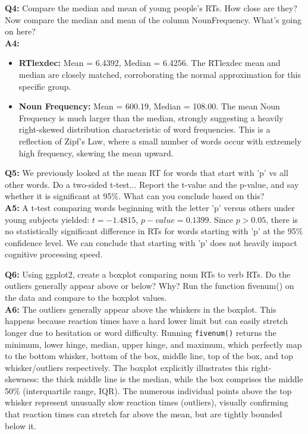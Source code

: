 \documentclass{article}
\begin{document}
\vspace{0.5cm}
\noindent\textbf{Q4:} Compare the median and mean of young people's RTs. How close are they?  Now compare the median and mean of the column NounFrequency. What's going on here? \\
\textbf{A4:} 
\begin{itemize}
    \item \textbf{RTlexdec:} Mean = 6.4392, Median = 6.4256. The RTlexdec mean and median are closely matched, corroborating the normal approximation for this specific group.
    \item \textbf{Noun Frequency:} Mean = 600.19, Median = 108.00. The mean Noun Frequency is much larger than the median, strongly suggesting a heavily right-skewed distribution characteristic of word frequencies. This is a reflection of Zipf's Law, where a small number of words occur with extremely high frequency, skewing the mean upward.
\end{itemize}

\vspace{0.5cm}
\noindent\textbf{Q5:} We previously looked at the mean RT for words that start with 'p' vs all other words. Do a two-sided t-test... Report the t-value and the p-value, and say whether it is significant at 95\%. What can you conclude based on this? \\
\textbf{A5:} A t-test comparing words beginning with the letter 'p' versus others under young subjects yielded: $t = -1.4815$, $p-value = 0.1399$. Since $p > 0.05$, there is no statistically significant difference in RTs for words starting with 'p' at the 95\% confidence level. We can conclude that starting with 'p' does not heavily impact cognitive processing speed.

\vspace{0.5cm}
\noindent\textbf{Q6:} Using ggplot2, create a boxplot comparing noun RTs to verb RTs. Do the outliers generally appear above or below?  Why? Run the function fivenum() on the data and compare to the boxplot values.\\
\textbf{A6:} The outliers generally appear above the whiskers in the boxplot. This happens because reaction times have a hard lower limit but can easily stretch longer due to hesitation or word difficulty. Running \texttt{fivenum()} returns the minimum, lower hinge, median, upper hinge, and maximum, which perfectly map to the bottom whisker, bottom of the box, middle line, top of the box, and top whisker/outliers respectively. The boxplot explicitly illustrates this right-skewness: the thick middle line is the median, while the box comprises the middle 50\% (interquartile range, IQR). The numerous individual points above the top whisker represent unusually slow reaction times (outliers), visually confirming that reaction times can stretch far above the mean, but are tightly bounded below it.
\end{document}
